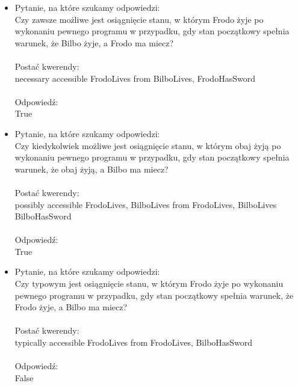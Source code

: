 \documentclass[11pt,a4paper]{article}
\begin{document}
\begin{itemize}
\item Pytanie, na które szukamy odpowiedzi: \\
Czy zawsze możliwe jest osiągnięcie stanu, w którym Frodo żyje po wykonaniu pewnego programu w przypadku, gdy stan początkowy spełnia warunek, że Bilbo żyje, a Frodo ma miecz? \\ \\
Postać kwerendy: \\
necessary accessible FrodoLives from BilboLives, FrodoHasSword \\ \\
Odpowiedź: \\
True


\item Pytanie, na które szukamy odpowiedzi: \\
Czy kiedykolwiek możliwe jest osiągnięcie stanu, w którym obaj żyją po wykonaniu pewnego programu w przypadku, gdy stan początkowy spełnia warunek, że obaj żyją, a Bilbo ma miecz? \\ \\
Postać kwerendy: \\
possibly accessible FrodoLives, BilboLives from FrodoLives, BilboLives BilboHasSword \\ \\
Odpowiedź: \\
True


\item Pytanie, na które szukamy odpowiedzi: \\
Czy typowym jest osiągnięcie stanu, w którym Frodo żyje po wykonaniu pewnego programu w przypadku, gdy stan początkowy spełnia warunek, że Frodo żyje, a Bilbo ma miecz? \\ \\
Postać kwerendy: \\
typically accessible FrodoLives from FrodoLives, BilboHasSword \\ \\
Odpowiedź: \\
False 

\end{itemize}
\end{document}
